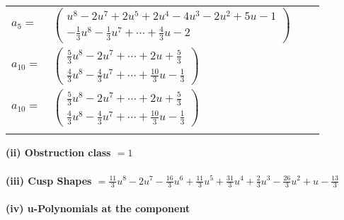 \documentclass[1p]{elsarticle_modified}
\theoremstyle{definition}
\begin{document}
\begin{tabular}{m{7pt} m{180pt} m{7pt} m{180pt} }
\flushright $a_{5}=$&$\begin{pmatrix}u^8-2 u^7+2 u^5+2 u^4-4 u^3-2 u^2+5 u-1\\-\frac{1}{3} u^8-\frac{1}{3} u^7+\cdots+\frac{4}{3} u-2\end{pmatrix}$ \\
\flushright $a_{10}=$&$\begin{pmatrix}\frac{5}{3} u^8-2 u^7+\cdots+2 u+\frac{5}{3}\\\frac{4}{3} u^8-\frac{4}{3} u^7+\cdots+\frac{10}{3} u-\frac{1}{3}\end{pmatrix}$\\ \flushright $a_{10}=$&$\begin{pmatrix}\frac{5}{3} u^8-2 u^7+\cdots+2 u+\frac{5}{3}\\\frac{4}{3} u^8-\frac{4}{3} u^7+\cdots+\frac{10}{3} u-\frac{1}{3}\end{pmatrix}$\\&\end{tabular}
\flushleft \textbf{(ii) Obstruction class $= 1$}\\~\\
\flushleft \textbf{(iii) Cusp Shapes $= \frac{11}{3} u^8-2 u^7-\frac{16}{3} u^6+\frac{11}{3} u^5+\frac{31}{3} u^4+\frac{2}{3} u^3-\frac{26}{3} u^2+u-\frac{13}{3}$}\\~\\
\newpage\renewcommand{\arraystretch}{1}
\flushleft \textbf{(iv) u-Polynomials at the component}\newline \\
\end{document}
